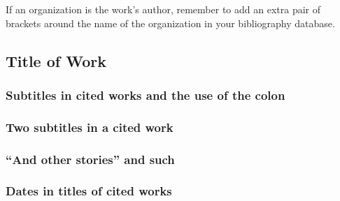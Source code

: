 \documentclass[11pt,letterpaper,oneside]{article}
\begin{document}
If an organization is the work's author, remember to add an extra pair
of brackets around the name of the organization in your bibliography
database.

\begin{citebib}
\item \cite{iso1997}
\item \cite{chicago2017}
\end{citebib}

\setcounter{subsection}{3}
\subsection{Title of Work}
\setcounter{subsection}{14}

\setcounter{subsubsection}{88}
\subsubsection{Subtitles in cited works and the use of the colon}

\begin{citebib}
\item \cite{gladwell2013}
\end{citebib}

\subsubsection{Two subtitles in a cited work}

\begin{citebib}
\item \cite{sereny1999}
\end{citebib}

\setcounter{subsubsection}{91}
\subsubsection{``And other stories'' and such}

\begin{citebib}
\item \cite[104]{maclean1976}
\end{citebib}

\subsubsection{Dates in titles of cited works}
\end{document}
